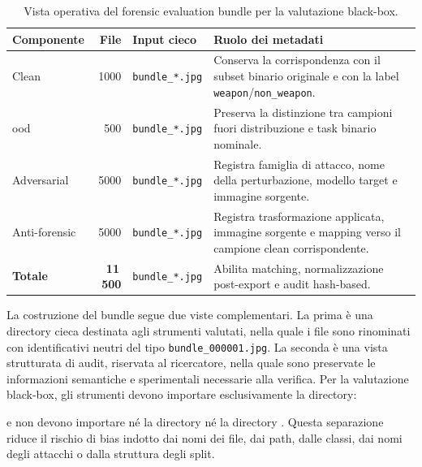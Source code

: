 \begin{table}[H]
\centering
\scriptsize
\renewcommand{\arraystretch}{1.15}
\setlength{\tabcolsep}{4pt}
\caption{Vista operativa del forensic evaluation bundle per la valutazione black-box.}
\label{tab:results-bundle-operational-layout}
\begin{tabularx}{\textwidth}{@{}l r l X@{}}
\toprule
\textbf{Componente} &
\textbf{File} &
\textbf{Input cieco} &
\textbf{Ruolo dei metadati} \\
\midrule

Clean &
1000 &
\texttt{bundle\_*.jpg} &
Conserva la corrispondenza con il subset binario originale e con la label
\texttt{weapon}/\texttt{non\_weapon}. \\

\gls{ood} &
500 &
\texttt{bundle\_*.jpg} &
Preserva la distinzione tra campioni fuori distribuzione e task binario
nominale. \\

Adversarial &
5000 &
\texttt{bundle\_*.jpg} &
Registra famiglia di attacco, nome della perturbazione, modello target e
immagine sorgente. \\

Anti-forensic &
5000 &
\texttt{bundle\_*.jpg} &
Registra trasformazione applicata, immagine sorgente e mapping verso il
campione clean corrispondente. \\

\midrule
\textbf{Totale} &
\textbf{11\,500} &
\texttt{bundle\_*.jpg} &
Abilita matching, normalizzazione post-export e audit hash-based. \\
\bottomrule
\end{tabularx}
\end{table}

La costruzione del bundle segue due viste complementari. La prima è una
directory cieca destinata agli strumenti valutati, nella quale i file sono
rinominati con identificativi neutri del tipo \texttt{bundle\_000001.jpg}. La
seconda è una vista strutturata di audit, riservata al ricercatore, nella quale
sono preservate le informazioni semantiche e sperimentali necessarie alla
verifica. Per la valutazione black-box, gli strumenti devono importare
esclusivamente la directory:

\begin{center}
\end{center}

e non devono importare né la directory  né la directory
. Questa separazione riduce il rischio di bias
indotto dai nomi dei file, dai path, dalle classi, dai nomi degli attacchi o
dalla struttura degli split.

